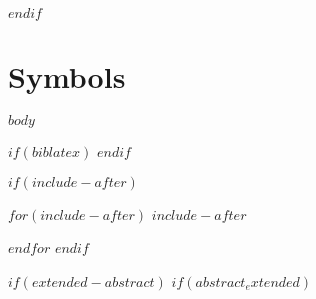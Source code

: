 \documentclass[$if(fontsize)$$fontsize$,$endif$$if(lang)$$babel-lang$,$endif$$if(papersize)$$papersize$paper,$endif$$for(classoption)$$classoption$$sep$,$endfor$]{$documentclass$}
\def\large{\fontsize{14}{21}\selectfont}  %
\renewcommand{\thechapter}{Chapter \arabic{chapter}}
\renewcommand{\thesection}{\arabic{chapter}.\arabic{section}}
\renewcommand{\thesubsection}{\arabic{chapter}.\arabic{section}.\arabic{subsection}}
\begin{document}
\makeatletter
\renewcommand*\l@table{\@dottedtocline{1}{0em}{5.5em}}
\renewcommand*\l@figure{\@dottedtocline{1}{0em}{5.5em}}
\makeatother

\newcommand{\lotlabel}{Table}
\renewcommand{\listtablename}{\vspace{-1.2cm}\center List of Tables \addcontentsline{toc}{chapter}{List of Tables}}
\renewcommand{\numberline}[1]{\lotlabel~#1\hspace*{1em}}
\listoftables
\newcommand{\loflabel}{Figure}
\renewcommand{\listfigurename}{\vspace{-1.2cm}\center List of Figures \addcontentsline{toc}{chapter}{List of Figures}}
\renewcommand{\numberline}[1]{\loflabel~#1\hspace*{1em}}
\listoffigures
\endgroup
$endif$

\chapter*{Symbols}
\large{$symbols$}

\mainmatter
$body$

$if(biblatex)$
\printbibliography
$endif$

$if(include-after)$
\setcounter{appendix}{1}
\renewcommand{\thechapter}{Appendix \Roman{appendix}}
\renewcommand{\thesection}{\arabic{section}.}
\renewcommand{\thesubsection}{\arabic{section}-\arabic{subsection}}
$for(include-after)$
\newpage
$include-after$
\addtocounter{appendix}{1}
$endfor$
$endif$

$if(extended-abstract)$
$if(abstract_extended)$
\end{document}
